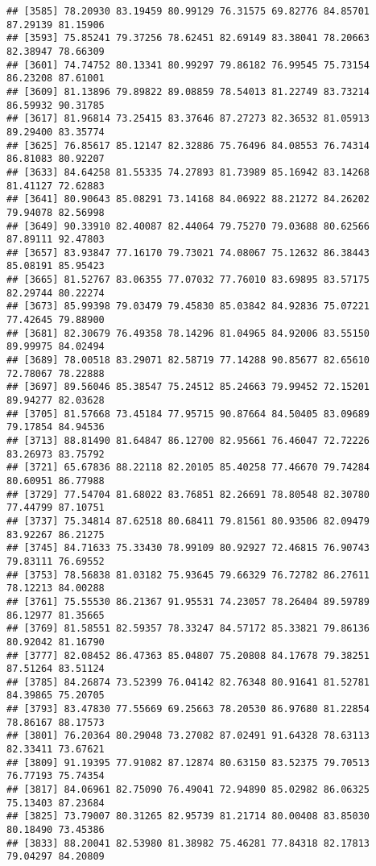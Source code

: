 \documentclass[
]{article}
\begin{document}
\begin{verbatim}
## [3585] 78.20930 83.19459 80.99129 76.31575 69.82776 84.85701 87.29139 81.15906
## [3593] 75.85241 79.37256 78.62451 82.69149 83.38041 78.20663 82.38947 78.66309
## [3601] 74.74752 80.13341 80.99297 79.86182 76.99545 75.73154 86.23208 87.61001
## [3609] 81.13896 79.89822 89.08859 78.54013 81.22749 83.73214 86.59932 90.31785
## [3617] 81.96814 73.25415 83.37646 87.27273 82.36532 81.05913 89.29400 83.35774
## [3625] 76.85617 85.12147 82.32886 75.76496 84.08553 76.74314 86.81083 80.92207
## [3633] 84.64258 81.55335 74.27893 81.73989 85.16942 83.14268 81.41127 72.62883
## [3641] 80.90643 85.08291 73.14168 84.06922 88.21272 84.26202 79.94078 82.56998
## [3649] 90.33910 82.40087 82.44064 79.75270 79.03688 80.62566 87.89111 92.47803
## [3657] 83.93847 77.16170 79.73021 74.08067 75.12632 86.38443 85.08191 85.95423
## [3665] 81.52767 83.06355 77.07032 77.76010 83.69895 83.57175 82.29744 80.22274
## [3673] 85.99398 79.03479 79.45830 85.03842 84.92836 75.07221 77.42645 79.88900
## [3681] 82.30679 76.49358 78.14296 81.04965 84.92006 83.55150 89.99975 84.02494
## [3689] 78.00518 83.29071 82.58719 77.14288 90.85677 82.65610 72.78067 78.22888
## [3697] 89.56046 85.38547 75.24512 85.24663 79.99452 72.15201 89.94277 82.03628
## [3705] 81.57668 73.45184 77.95715 90.87664 84.50405 83.09689 79.17854 84.94536
## [3713] 88.81490 81.64847 86.12700 82.95661 76.46047 72.72226 83.26973 83.75792
## [3721] 65.67836 88.22118 82.20105 85.40258 77.46670 79.74284 80.60951 86.77988
## [3729] 77.54704 81.68022 83.76851 82.26691 78.80548 82.30780 77.44799 87.10751
## [3737] 75.34814 87.62518 80.68411 79.81561 80.93506 82.09479 83.92267 86.21275
## [3745] 84.71633 75.33430 78.99109 80.92927 72.46815 76.90743 79.83111 76.69552
## [3753] 78.56838 81.03182 75.93645 79.66329 76.72782 86.27611 78.12213 84.00288
## [3761] 75.55530 86.21367 91.95531 74.23057 78.26404 89.59789 86.12977 81.35665
## [3769] 81.58551 82.59357 78.33247 84.57172 85.33821 79.86136 80.92042 81.16790
## [3777] 82.08452 86.47363 85.04807 75.20808 84.17678 79.38251 87.51264 83.51124
## [3785] 84.26874 73.52399 76.04142 82.76348 80.91641 81.52781 84.39865 75.20705
## [3793] 83.47830 77.55669 69.25663 78.20530 86.97680 81.22854 78.86167 88.17573
## [3801] 76.20364 80.29048 73.27082 87.02491 91.64328 78.63113 82.33411 73.67621
## [3809] 91.19395 77.91082 87.12874 80.63150 83.52375 79.70513 76.77193 75.74354
## [3817] 84.06961 82.75090 76.49041 72.94890 85.02982 86.06325 75.13403 87.23684
## [3825] 73.79007 80.31265 82.95739 81.21714 80.00408 83.85030 80.18490 73.45386
## [3833] 88.20041 82.53980 81.38982 75.46281 77.84318 82.17813 79.04297 84.20809

\end{verbatim}
\end{document}
